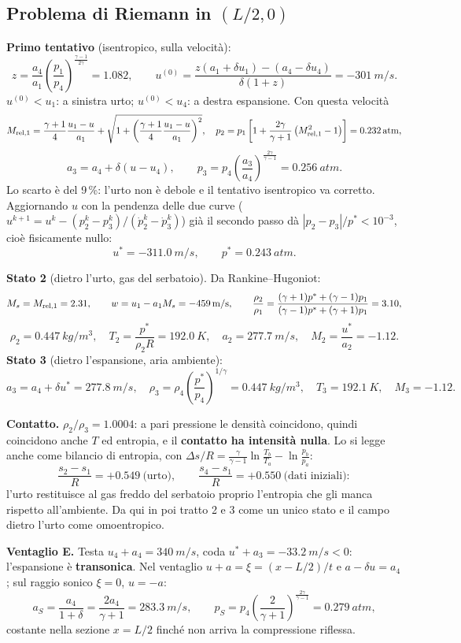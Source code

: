 \documentclass[11pt,a4paper]{article}
\newcommand{\Ms}{M_{s}}
\begin{document}
\subsection*{Problema di Riemann in $(L/2,0)$}
\textbf{Primo tentativo} (isentropico, sulla velocità):
\[
z=\frac{a_4}{a_1}\left(\frac{p_1}{p_4}\right)^{\frac{\gamma-1}{2\gamma}}=\num{1.082},\qquad
u^{(0)}=\frac{z(a_1+\delta u_1)-(a_4-\delta u_4)}{\delta(1+z)}=\SI{-301}{m/s}.
\]
$u^{(0)}<u_1$: a sinistra urto; $u^{(0)}<u_4$: a destra espansione. Con questa velocità
\[
M_{\rm rel,1}=\frac{\gamma+1}{4}\frac{u_1-u}{a_1}+\sqrt{1+\left(\frac{\gamma+1}{4}\frac{u_1-u}{a_1}\right)^2},\quad
p_2=p_1\left[1+\frac{2\gamma}{\gamma+1}\left(M_{\rm rel,1}^2-1\right)\right]=\SI{0.232}{atm},
\]
\[
a_3=a_4+\delta(u-u_4),\qquad p_3=p_4\left(\frac{a_3}{a_4}\right)^{\frac{2\gamma}{\gamma-1}}=\SI{0.256}{atm}.
\]
Lo scarto è del 9\,\%: l'urto non è debole e il tentativo isentropico va corretto. Aggiornando $u$ con la
pendenza delle due curve ($u^{k+1}=u^k-(p_2^k-p_3^k)/(\dot p_2^k-\dot p_3^k)$) già il secondo passo dà
$|p_2-p_3|/p^*<10^{-3}$, cioè fisicamente nullo:
\[
u^*=\SI{-311.0}{m/s},\qquad p^*=\SI{0.243}{atm}.
\]

\textbf{Stato 2} (dietro l'urto, gas del serbatoio). Da Rankine--Hugoniot:
\[
\Ms=M_{\rm rel,1}=\num{2.31},\qquad w=u_1-a_1\Ms=\SI{-459}{m/s},\qquad
\frac{\rho_2}{\rho_1}=\frac{(\gamma+1)p^*+(\gamma-1)p_1}{(\gamma-1)p^*+(\gamma+1)p_1}=\num{3.10},
\]
\[
\rho_2=\SI{0.447}{kg/m^3},\quad T_2=\frac{p^*}{\rho_2R}=\SI{192.0}{K},\quad a_2=\SI{277.7}{m/s},\quad
M_2=\frac{u^*}{a_2}=\num{-1.12}.
\]
\textbf{Stato 3} (dietro l'espansione, aria ambiente):
\[
a_3=a_4+\delta u^*=\SI{277.8}{m/s},\quad \rho_3=\rho_4\left(\frac{p^*}{p_4}\right)^{1/\gamma}=\SI{0.447}{kg/m^3},
\quad T_3=\SI{192.1}{K},\quad M_3=\num{-1.12}.
\]

\textbf{Contatto.} $\rho_2/\rho_3=\num{1.0004}$: a pari pressione le densità coincidono, quindi coincidono anche
$T$ ed entropia, e il \textbf{contatto ha intensità nulla}. Lo si legge anche come bilancio di entropia,
con $\Delta s/R=\frac{\gamma}{\gamma-1}\ln\frac{T_b}{T_a}-\ln\frac{p_b}{p_a}$:
\[
\frac{s_2-s_1}{R}=+\num{0.549}\ \text{(urto)},\qquad \frac{s_4-s_1}{R}=+\num{0.550}\ \text{(dati iniziali)}:
\]
l'urto restituisce al gas freddo del serbatoio proprio l'entropia che gli manca rispetto all'ambiente. Da qui in
poi tratto 2 e 3 come un unico stato e il campo dietro l'urto come omoentropico.

\textbf{Ventaglio E.} Testa $u_4+a_4=\SI{340}{m/s}$, coda $u^*+a_3=\SI{-33.2}{m/s}<0$: l'espansione è
\textbf{transonica}. Nel ventaglio $u+a=\xi=(x-L/2)/t$ e $a-\delta u=a_4$; sul raggio sonico $\xi=0$, $u=-a$:
\[
a_S=\frac{a_4}{1+\delta}=\frac{2a_4}{\gamma+1}=\SI{283.3}{m/s},\qquad
p_S=p_4\left(\frac{2}{\gamma+1}\right)^{\frac{2\gamma}{\gamma-1}}=\SI{0.279}{atm},
\]
costante nella sezione $x=L/2$ finché non arriva la compressione riflessa.
\end{document}
